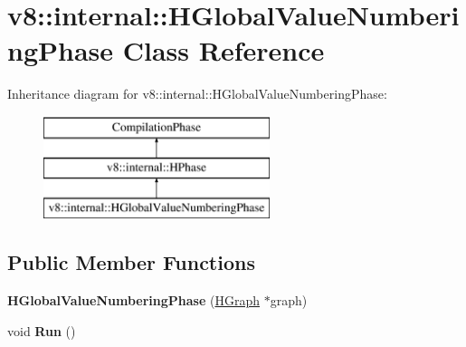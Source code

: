 \hypertarget{classv8_1_1internal_1_1_h_global_value_numbering_phase}{}\section{v8\+:\+:internal\+:\+:H\+Global\+Value\+Numbering\+Phase Class Reference}
\label{classv8_1_1internal_1_1_h_global_value_numbering_phase}
Inheritance diagram for v8\+:\+:internal\+:\+:H\+Global\+Value\+Numbering\+Phase\+:\begin{figure}[H]
\begin{center}
\leavevmode
\includegraphics[height=3.000000cm]{classv8_1_1internal_1_1_h_global_value_numbering_phase}
\end{center}
\end{figure}
\subsection*{Public Member Functions}
\begin{DoxyCompactItemize}
\item 
{\bfseries H\+Global\+Value\+Numbering\+Phase} (\hyperlink{classv8_1_1internal_1_1_h_graph}{H\+Graph} $\ast$graph)\hypertarget{classv8_1_1internal_1_1_h_global_value_numbering_phase_ad456b7668d221008188c65ace91cf6cd}{}\label{classv8_1_1internal_1_1_h_global_value_numbering_phase_ad456b7668d221008188c65ace91cf6cd}

\item 
void {\bfseries Run} ()\hypertarget{classv8_1_1internal_1_1_h_global_value_numbering_phase_a646a015614e1bf3402b538e4b287b97e}{}\label{classv8_1_1internal_1_1_h_global_value_numbering_phase_a646a015614e1bf3402b538e4b287b97e}

\end{DoxyCompactItemize}
